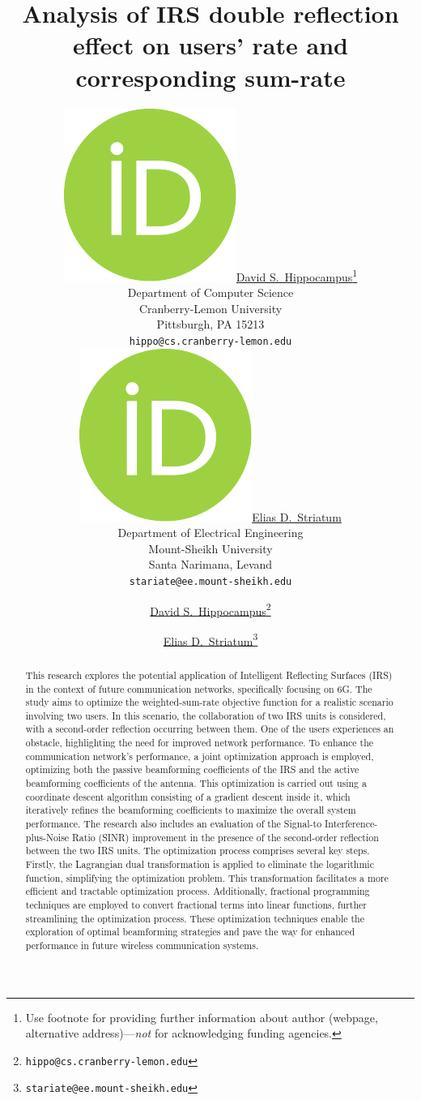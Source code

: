 \documentclass{article}
\title{Analysis of IRS double reflection effect on users' rate and corresponding sum-rate}
\author{ \href{https://orcid.org/0000-0000-0000-0000}{\includegraphics[scale=0.06]{orcid.pdf}\hspace{1mm}David S.~Hippocampus}\thanks{Use footnote for providing further
		information about author (webpage, alternative
		address)---\emph{not} for acknowledging funding agencies.} \\
	Department of Computer Science\\
	Cranberry-Lemon University\\
	Pittsburgh, PA 15213 \\
	\texttt{hippo@cs.cranberry-lemon.edu} \\
	\And
	\href{https://orcid.org/0000-0000-0000-0000}{\includegraphics[scale=0.06]{orcid.pdf}\hspace{1mm}Elias D.~Striatum} \\
	Department of Electrical Engineering\\
	Mount-Sheikh University\\
	Santa Narimana, Levand \\
	\texttt{stariate@ee.mount-sheikh.edu} \\
}
\author[1]{%
	\href{https://orcid.org/0000-0000-0000-0000}{\usebox{\orcid}\hspace{1mm}David S.~Hippocampus\thanks{\texttt{hippo@cs.cranberry-lemon.edu}}}%
}
\author[1,2]{%
	\href{https://orcid.org/0000-0000-0000-0000}{\usebox{\orcid}\hspace{1mm}Elias D.~Striatum\thanks{\texttt{stariate@ee.mount-sheikh.edu}}}%
}
\affil[1]{Department of Computer Science, Cranberry-Lemon University, Pittsburgh, PA 15213}
\affil[2]{Department of Electrical Engineering, Mount-Sheikh University, Santa Narimana, Levand}
\begin{document}
\maketitle

\begin{abstract}
	This research explores the potential application of Intelligent Reflecting Surfaces (IRS) in the context of future communication networks, specifically focusing on 6G.
	The study aims to optimize the weighted-sum-rate objective function for a realistic scenario involving two users.
	In this scenario, the collaboration of two IRS units is considered, with a second-order reflection occurring between them.
	One of the users experiences an obstacle, highlighting the need for improved network performance.
	To enhance the communication network’s performance, a joint optimization approach is employed, optimizing both the passive beamforming coefficients of the IRS and the active beamforming coefficients of the antenna.
	This optimization is carried out using a coordinate descent algorithm consisting of a gradient descent inside it, which iteratively refines the beamforming coefficients to maximize the overall system performance. 
	The research also includes an evaluation of the Signal-to Interference-plus-Noise Ratio (SINR) improvement in the presence of the second-order reflection between the two IRS units.
	The optimization process comprises several key steps.
	Firstly, the Lagrangian dual transformation is applied to eliminate the logarithmic function, simplifying the optimization problem.
	This transformation facilitates a more efficient and tractable optimization process.
	Additionally, fractional programming techniques are employed to convert fractional terms into linear functions, further streamlining the optimization process.
	These optimization techniques enable the exploration of optimal beamforming strategies and pave the way for enhanced performance in future wireless communication systems.
\end{abstract}


\end{document}
